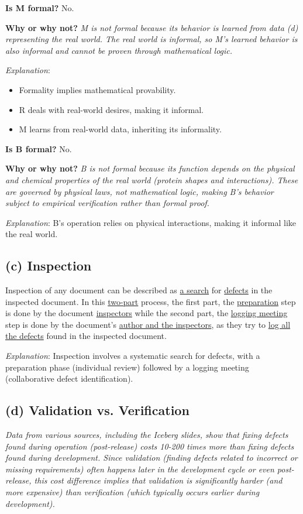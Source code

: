 \documentclass{article}
\begin{document}
\textbf{Is M formal?} No.

\textbf{Why or why not?} \textit{M is not formal because its behavior is learned from data (d) representing the real world. The real world is informal, so M's learned behavior is also informal and cannot be proven through mathematical logic.}

\textit{Explanation}:
\begin{itemize}
    \item Formality implies mathematical provability.
    \item R deals with real-world desires, making it informal.
    \item M learns from real-world data, inheriting its informality.
\end{itemize}

\textbf{Is B formal?} No.

\textbf{Why or why not?} \textit{B is not formal because its function depends on the physical and chemical properties of the real world (protein shapes and interactions). These are governed by physical laws, not mathematical logic, making B's behavior subject to empirical verification rather than formal proof.}

\textit{Explanation}: B's operation relies on physical interactions, making it informal like the real world.

\subsection*{(c) Inspection}
Inspection of any document can be described as \underline{a search} for \underline{defects} in the inspected document. In this \underline{two-part} process, the first part, the \underline{preparation} step is done by the document \underline{inspectors} while the second part, the \underline{logging meeting} step is done by the document's \underline{author and the inspectors}, as they try to \underline{log all the defects} found in the inspected document.

\textit{Explanation}: Inspection involves a systematic search for defects, with a preparation phase (individual review) followed by a logging meeting (collaborative defect identification).

\subsection*{(d) Validation vs. Verification}

\textit{Data from various sources, including the Iceberg slides, show that fixing defects found during operation (post-release) costs 10-200 times more than fixing defects found during development. Since validation (finding defects related to incorrect or missing requirements) often happens later in the development cycle or even post-release, this cost difference implies that validation is significantly harder (and more expensive) than verification (which typically occurs earlier during development).}
\end{document}
